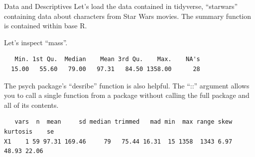 \documentclass[
  ignorenonframetext,
]{beamer}
\newenvironment{Shaded}{\begin{snugshade}}{\end{snugshade}}
\newcommand{\CommentTok}[1]{\textcolor[rgb]{0.37,0.37,0.37}{#1}}
\newcommand{\FunctionTok}[1]{\textcolor[rgb]{0.28,0.35,0.67}{#1}}
\newcommand{\NormalTok}[1]{\textcolor[rgb]{0.00,0.23,0.31}{#1}}
\newcommand{\SpecialCharTok}[1]{\textcolor[rgb]{0.37,0.37,0.37}{#1}}
\begin{document}
\begin{frame}[fragile]{Data and Descriptives}
\protect\hypertarget{data-and-descriptives}{}
Let's load the data contained in tidyverse, ``starwars'' containing data
about characters from Star Wars movies. The summary function is
contained within base R.

Let's inspect ``mass''.

\begin{Shaded}
\end{Shaded}

\begin{verbatim}
   Min. 1st Qu.  Median    Mean 3rd Qu.    Max.    NA's 
  15.00   55.60   79.00   97.31   84.50 1358.00      28 
\end{verbatim}
\end{frame}

\begin{frame}[fragile]
The psych package's ``desribe'' function is also helpful. The ``::''
argument allows you to call a single function from a package without
calling the full package and all of its contents.

\begin{Shaded}
\end{Shaded}

\begin{verbatim}
   vars  n  mean     sd median trimmed   mad min  max range skew kurtosis    se
X1    1 59 97.31 169.46     79   75.44 16.31  15 1358  1343 6.97    48.93 22.06
\end{verbatim}
\end{frame}
\end{document}
